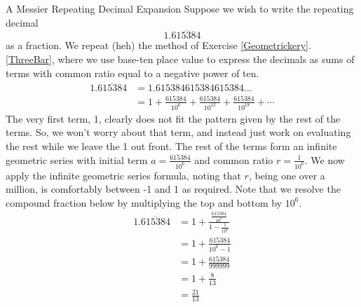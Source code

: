 \begin{example}{A Messier Repeating Decimal Expansion}
Suppose we wish to write the repeating decimal $$1.\overline{615384} $$ as a fraction. We repeat (heh) the method of Exercise \ref{Geometrickery}.\ref{ThreeBar}, where we use base-ten place value to express the decimals as sums of terms with common ratio equal to a negative power of ten.
\begin{align*}
1.\overline{615384}&=1.615384615384615384\ldots \\
&=1+\frac{615384}{10^6}+\frac{615384}{10^{12}}+\frac{615384}{10^{18}}+\cdots
\end{align*}
The very first term, 1, clearly does not fit the pattern given by the rest of the terms.  So, we won't worry about that term, and instead just work on evaluating the rest while we leave the 1 out front.  The rest of the terms form an infinite geometric series with initial term $a=\frac{615384}{10^{6}}$ and common ratio $r=\frac{1}{10^6}$.  We now apply the infinite geometric series formula, noting that $r$, being one over a million, is comfortably between -1 and 1 as required.  Note that we resolve the compound fraction below by multiplying the top and bottom by $10^6$.
\begin{align*}
1.\overline{615384}
&=1+\frac{\frac{615384}{10^6}}{1-\frac{1}{10^6}} \\
&=1+\frac{615384}{10^6-1}\\
&=1+\frac{615384}{999999}\\
&=1+\frac{8}{13}\\
&=\frac{21}{13}\\
\end{align*}
\end{example}

